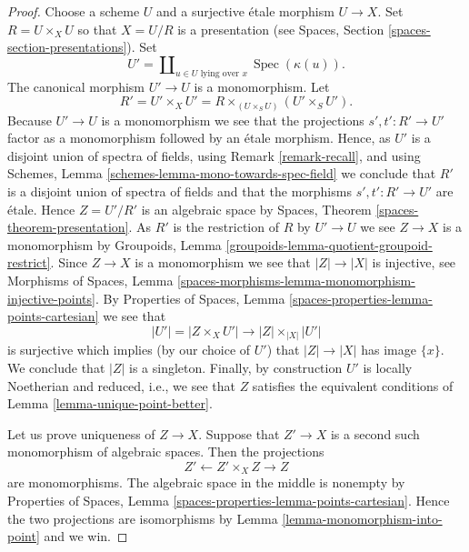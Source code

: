 \documentclass{stacks-project}
\theoremstyle{plain}
\theoremstyle{definition}
\theoremstyle{remark}
\numberwithin{equation}{subsection}
\def\Spec{\mathop{\mathrm{Spec}}}
\begin{document}
\begin{proof}
Choose a scheme $U$ and a surjective \'etale morphism $U \to X$.
Set $R = U \times_X U$ so that $X = U/R$ is a presentation (see
Spaces, Section \ref{spaces-section-presentations}).
Set
$$
U' = \coprod\nolimits_{u \in U\text{ lying over }x} \Spec(\kappa(u)).
$$
The canonical morphism $U' \to U$ is a monomorphism. Let
$$
R' = U' \times_X U' = R \times_{(U \times_S U)} (U' \times_S U').
$$
Because $U' \to U$ is a monomorphism we see that the projections
$s', t' : R' \to U'$ factor as a monomorphism followed by an
\'etale morphism. Hence, as $U'$ is a disjoint union of spectra
of fields, using
Remark \ref{remark-recall},
and using
Schemes, Lemma \ref{schemes-lemma-mono-towards-spec-field}
we conclude that $R'$ is a disjoint union of spectra of fields and
that the morphisms $s', t' : R' \to U'$ are \'etale. Hence
$Z = U'/R'$ is an algebraic space by
Spaces, Theorem \ref{spaces-theorem-presentation}.
As $R'$ is the restriction of $R$ by $U' \to U$ we see
$Z \to X$ is a monomorphism by
Groupoids, Lemma \ref{groupoids-lemma-quotient-groupoid-restrict}.
Since $Z \to X$ is a monomorphism we see that $|Z| \to |X|$ is injective, see
Morphisms of Spaces, Lemma
\ref{spaces-morphisms-lemma-monomorphism-injective-points}.
By
Properties of Spaces, Lemma \ref{spaces-properties-lemma-points-cartesian}
we see that
$$
|U'| = |Z \times_X U'| \to |Z| \times_{|X|} |U'|
$$
is surjective which implies (by our choice of $U'$) that
$|Z| \to |X|$ has image $\{x\}$. We conclude that $|Z|$ is a singleton.
Finally, by construction $U'$ is locally Noetherian and reduced, i.e.,
we see that $Z$ satisfies the equivalent conditions of
Lemma \ref{lemma-unique-point-better}.

\medskip\noindent
Let us prove uniqueness of $Z \to X$. Suppose that
$Z' \to X$ is a second such monomorphism of algebraic spaces.
Then the projections
$$
Z' \longleftarrow Z' \times_X Z \longrightarrow Z
$$
are monomorphisms. The algebraic space in the middle is nonempty by
Properties of Spaces,
Lemma \ref{spaces-properties-lemma-points-cartesian}.
Hence the two projections are isomorphisms by
Lemma \ref{lemma-monomorphism-into-point}
and we win.
\end{proof}
\end{document}

